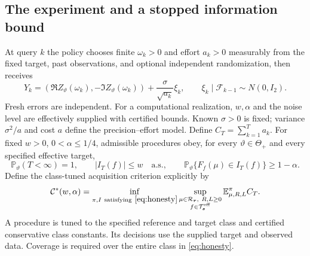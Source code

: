 \documentclass[10pt]{amsart}
\theoremstyle{definition}
\theoremstyle{remark}
\newcommand{\E}{\mathbb E}
\newcommand{\Prob}{\mathbb P}
\newcommand{\ThetaAll}{\Theta_+}
\newcommand{\Teff}{\mathcal T_{\boldsymbol s}^{\mathrm{eff}}}
\newcommand{\Rclass}{\mathcal R_{\boldsymbol r}}
\begin{document}
\subsection{The experiment and a stopped information bound}
At query $k$ the policy chooses finite $\omega_k>0$ and effort $a_k>0$ measurably from the fixed target, past observations, and optional independent randomization, then receives
\begin{equation}\label{eq:gaussian}
 Y_k=(\Re Z_\vartheta(\omega_k),-\Im Z_\vartheta(\omega_k))
          +\frac{\sigma}{\sqrt{a_k}}\xi_k,
 \qquad \xi_k\mid\mathcal F_{k-1}\sim N(0,I_2).
\end{equation}
Fresh errors are independent. For a computational realization, $w,\alpha$ and the noise level are effectively supplied with certified bounds. Known $\sigma>0$ is fixed; variance $\sigma^2/a$ and cost $a$ define the precision--effort model. Define $C_T=\sum_{k=1}^Ta_k$. For fixed $w>0$, $0<\alpha\le1/4$, admissible procedures obey, for every $\vartheta\in\ThetaAll$ and every specified effective target,
\begin{equation}\label{eq:honesty}
 \Prob_\vartheta(T<\infty)=1,\qquad
 |I_T(f)|\le w\quad\text{a.s.},\qquad
 \Prob_\vartheta\{F_f(\mu)\in I_T(f)\}\ge1-\alpha.
\end{equation}
Define the class-tuned acquisition criterion explicitly by
\[
 \mathcal C^*(w,\alpha)=\inf_{\pi,I\ \mathrm{satisfying}\ \eqref{eq:honesty}}
 \sup_{\substack{\mu\in\Rclass,\ R,L\ge0\\ f\in\Teff}}
 \E_{\mu,R,L}^{\pi} C_T.
\]
A procedure is tuned to the specified reference and target class and certified conservative class constants. Its decisions use the supplied target and observed data. Coverage is required over the entire class in \eqref{eq:honesty}.
\end{document}
